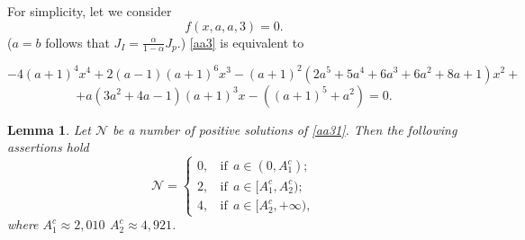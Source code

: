 \documentclass[sn-mathphys]{sn-jnl}%
\theoremstyle{thmstyleone}%
\theoremstyle{thmstyletwo}%
\newtheorem{lemma}{Lemma}
\theoremstyle{thmstylethree}%
\begin{document}
For simplicity, let we consider
\begin{equation}\label{aa3}
f(x,a,a,3)=0.
\end{equation}
($a=b$ follows that $J_I=\frac{\alpha}{1-\alpha}J_p$.) \eqref{aa3} is equivalent to

$$-4(a+1)^4x^4+2(a-1)(a+1)^6x^3-(a+1)^2(2a^5+5a^4+6a^3+6a^2+8a+1)x^2+$$\begin{equation}\label{aa31}+a(3a^2+4a-1)(a+1)^3x-((a+1)^5+a^2)=0.
\end{equation}

\begin{lemma}\label{numsol} Let $\mathcal N$ be a number of positive solutions of \eqref{aa31}. Then the following assertions hold
\begin{equation}\label{x}
\mathcal N=\left\{
	\begin{array}{ll}
		 0,\ \ \ \ \mbox{if} \ \ a\in (0, A^c_1); \\[2mm]
		 2,\ \ \ \ \mbox{if} \ \ a\in [A^c_1, A^c_2); \\[2mm]
 4,\ \ \ \ \mbox{if} \ \ a\in [A^c_2, +\infty),
	\end{array}\right.
\end{equation}
where $A^c_1\approx2,010\, \ A^c_2\approx4,921$.
\end{lemma}
\end{document}
